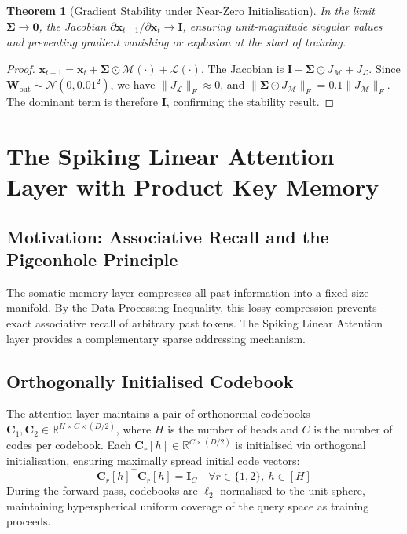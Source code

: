 \documentclass[11pt]{article}
\newtheorem{theorem}{Theorem}[section]
\begin{document}
\begin{theorem}[Gradient Stability under Near-Zero Initialisation]
In the limit $\boldsymbol{\Sigma} \to \mathbf{0}$, the Jacobian $\partial \mathbf{x}_{t+1} / \partial \mathbf{x}_t \to \mathbf{I}$, ensuring unit-magnitude singular values and preventing gradient vanishing or explosion at the start of training.
\end{theorem}
\begin{proof}
$\mathbf{x}_{t+1} = \mathbf{x}_t + \boldsymbol{\Sigma} \odot \mathcal{M}(\cdot) + \mathcal{L}(\cdot)$. The Jacobian is $\mathbf{I} + \boldsymbol{\Sigma} \odot J_{\mathcal{M}} + J_{\mathcal{L}}$. Since $\mathbf{W}_{\mathrm{out}} \sim \mathcal{N}(0, 0.01^2)$, we have $\|J_{\mathcal{L}}\|_F \approx 0$, and $\|\boldsymbol{\Sigma} \odot J_{\mathcal{M}}\|_F = 0.1\|J_{\mathcal{M}}\|_F$. The dominant term is therefore $\mathbf{I}$, confirming the stability result.
\end{proof}

\section{The Spiking Linear Attention Layer with Product Key Memory}

\subsection{Motivation: Associative Recall and the Pigeonhole Principle}

The somatic memory layer compresses all past information into a fixed-size manifold. By the Data Processing Inequality, this lossy compression prevents exact associative recall of arbitrary past tokens. The Spiking Linear Attention layer provides a complementary sparse addressing mechanism.

\subsection{Orthogonally Initialised Codebook}

The attention layer maintains a pair of orthonormal codebooks $\mathbf{C}_1, \mathbf{C}_2 \in \mathbb{R}^{H \times C \times (D/2)}$, where $H$ is the number of heads and $C$ is the number of codes per codebook. Each $\mathbf{C}_r[h] \in \mathbb{R}^{C \times (D/2)}$ is initialised via orthogonal initialisation, ensuring maximally spread initial code vectors:
\begin{equation}
    \mathbf{C}_r[h]^\top \mathbf{C}_r[h] = \mathbf{I}_{C} \quad \forall r \in \{1, 2\},\ h \in [H]
\end{equation}
During the forward pass, codebooks are $\ell_2$-normalised to the unit sphere, maintaining hyperspherical uniform coverage of the query space as training proceeds.
\end{document}
